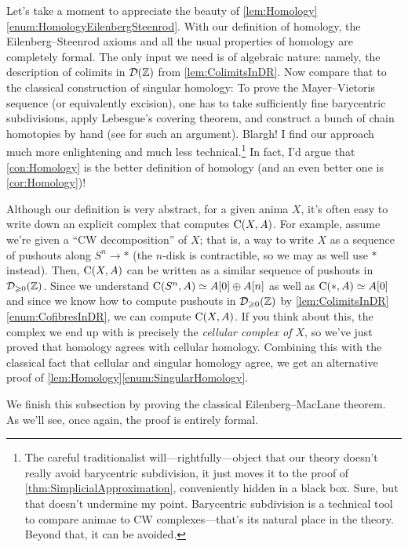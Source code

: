 \begin{rem}
	Let's take a moment to appreciate the beauty of \cref{lem:Homology}\cref{enum:HomologyEilenbergSteenrod}. With our definition of homology, the Eilenberg--Steenrod axioms and all the usual properties of homology are completely formal. The only input we need is of algebraic nature: namely, the description of colimits in $\mathcal{D}(\mathbb{Z})$ from \cref{lem:ColimitsInDR}. Now compare that to the classical construction of singular homology: To prove the Mayer--Vietoris sequence (or equivalently excision), one has to take sufficiently fine barycentric subdivisions, apply Lebesgue's covering theorem, and construct a bunch of chain homotopies by hand (see \cite[Proposition~\href{https://pi.math.cornell.edu/~hatcher/AT/AT.pdf\#page=128}{2.21}]{Hatcher} for such an argument). Blargh! I find our approach much more enlightening and much less technical.\footnote{The careful traditionalist will---rightfully---object that our theory doesn't really avoid barycentric subdivision, it just moves it to the proof of \cref{thm:SimplicialApproximation}, conveniently hidden in a black box. Sure, but that doesn't undermine my point. Barycentric subdivision is a technical tool to compare animae to CW complexes---that's its natural place in the theory. Beyond that, it can be avoided.} In fact, I'd argue that \cref{con:Homology} is the better definition of homology (and an even better one is \cref{cor:Homology})!
	
	Although our definition is very abstract, for a given anima $X$, it's often easy to write down an explicit complex that computes $\operatorname{C}(X,A)$. For example, assume we're given a \enquote{CW decomposition} of $X$; that is, a way to write $X$ as a sequence of pushouts along $S^n\rightarrow *$ (the $n$-disk is contractible, so we may as well use $*$ instead). Then, $\operatorname{C}(X,A)$ can be written as a similar sequence of pushouts in $\mathcal{D}_{\geqslant 0}(\mathbb{Z})$. Since we understand $\operatorname{C}(S^n,A)\simeq A[0]\oplus A[n]$ as well as $\operatorname{C}(*,A)\simeq A[0]$ and since we know how to compute pushouts in $\mathcal{D}_{\geqslant 0}(\mathbb{Z})$ by \cref{lem:ColimitsInDR}\cref{enum:CofibresInDR}, we can compute $\operatorname{C}(X,A)$. If you think about this, the complex we end up with is precisely the \emph{cellular complex of $X$}, so we've just proved that homology agrees with cellular homology. Combining this with the classical fact that cellular and singular homology agree, we get an alternative proof of \cref{lem:Homology}\cref{enum:SingularHomology}.
\end{rem}
We finish this subsection by proving the classical Eilenberg--MacLane theorem. As we'll see, once again, the proof is entirely formal.
